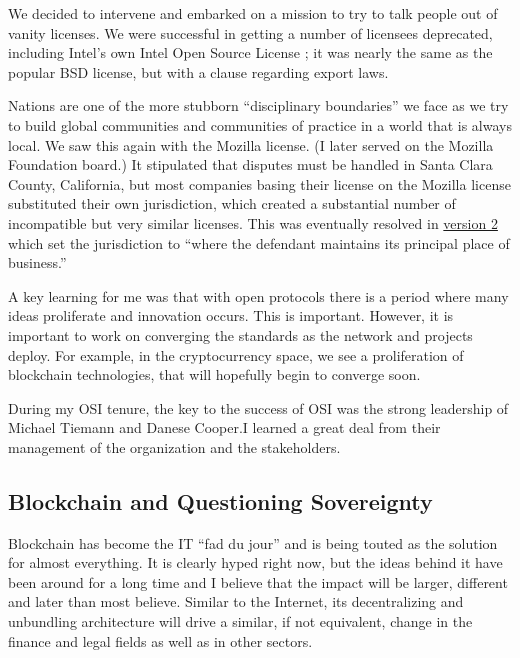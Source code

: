 We decided to intervene and embarked on a mission to try to talk people out of vanity licenses. We were successful in getting a number of licensees deprecated, including Intel's own Intel Open Source License \cite{LicenseP82:online} ; it was nearly the same as the popular BSD license, but with a clause regarding export laws.

Nations are one of the more stubborn ``disciplinary boundaries'' we face as we try to build global communities and communities of practice in a world that is always local. We saw this again with the Mozilla license. (I later served on the Mozilla Foundation board.) It stipulated that disputes must be handled in Santa Clara County, California, but most companies basing their license on the Mozilla license substituted their own jurisdiction, which created a substantial number of incompatible but very similar licenses. This was eventually resolved in \href{https://opensource.org/licenses/MPL-2.0}{version 2} which set the jurisdiction to ``where the defendant maintains its principal place of business.''

A key learning for me was that with open protocols there is a period where many ideas proliferate and innovation occurs. This is important. However, it is important to work on converging the standards as the network and projects deploy. For example, in the cryptocurrency space, we see a proliferation of blockchain technologies, that will hopefully begin to converge soon.

During my \ac{OSI} tenure, the key to the success of \ac{OSI} was the strong leadership of Michael Tiemann and Danese Cooper.I learned a great deal from their management of the organization and the stakeholders.

\subsection{Blockchain and Questioning Sovereignty}

Blockchain has become the IT ``fad du jour'' and is being touted as the solution for almost everything. It is clearly hyped right now, but the ideas behind it have been around for a long time and I believe that the impact will be larger, different and later than most believe. Similar to the Internet, its decentralizing and unbundling architecture will drive a similar, if not equivalent, change in the finance and legal fields as well as in other sectors.

